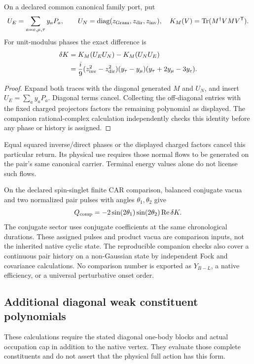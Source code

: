\documentclass[11pt,a4paper]{article}
\begin{document}
\begin{proposition}
\label{p5c:prop:v2167-chronological-family-kernel}
On a declared common canonical family port, put
\[
 U_E=\sum_{a=e,\mu,\tau}y_aP_a,\qquad
 U_N=\operatorname{diag}(z_{\rm Gram},z_{\rm dir},z_{\rm inv}),\quad
 K_M(V)=\operatorname{Tr}(M^\dagger V M V^{\mathsf T}).
\]
For unit-modulus phases the exact difference is
\[
 \begin{aligned}
 \delta K&=K_M(U_EU_N)-K_M(U_NU_E)\\
 &=\frac i9(z_{\rm inv}^2-z_{\rm dir}^2)
 (y_\tau-y_\mu)(y_\tau+2y_\mu-3y_e).
 \end{aligned}
\]
\end{proposition}
\begin{proof}
Expand both traces with the diagonal generated $M$ and $U_N$, and insert
$U_E=\sum_a y_aP_a$. Diagonal terms cancel. Collecting the off-diagonal
entries with the fixed charged projectors factors the remaining polynomial
as displayed. The companion rational-complex calculation independently
checks this identity before any phase or history is assigned.
\end{proof}
Equal squared inverse/direct phases or the displayed charged factors
cancel this particular return. Its physical use requires those normal
flows to be generated on the pair's same canonical carrier. Terminal
energy values alone do not license such flows.

On the declared spin-singlet finite CAR comparison, balanced conjugate
vacua and two normalized pair pulses with angles $\theta_1,\theta_2$
give
\[
 Q_{\rm comp}=-2\sin(2\theta_1)\sin(2\theta_2)
                 \operatorname{Re}\delta K.
\]
The conjugate sector uses conjugate coefficients at the same chronological
durations. These assigned pulses and product vacua are comparison inputs,
not the inherited native cyclic state. The reproducible companion checks
also cover a continuous pair history on a non-Gaussian state by independent
Fock and covariance calculations. No comparison number is exported as
$Y_{B-L}$, a native efficiency, or a universal perturbative onset order.





\subsection{Additional diagonal weak constituent polynomials}
\label{p5c:app:v2169-occupation-polynomials}
These calculations require the stated diagonal one-body blocks and actual
occupation cap in addition to the native vertex. They evaluate those complete
constituents and do not assert that the physical full action has this form.\par
\end{document}
